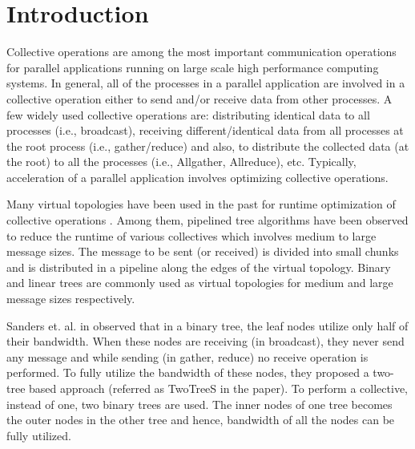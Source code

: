 \documentclass[sigplan,review,anonymous]{acmart}\settopmatter{printfolios=true,printccs=false,printacmref=false}
\begin{document}
\maketitle


\section{Introduction}
Collective operations are among the most important communication operations for parallel applications running on large scale high performance computing systems. In general, all of the processes in a parallel application are involved in a collective operation either to send and/or receive data from other processes. A few widely used collective operations are: distributing identical data to all processes (i.e., broadcast), receiving different/identical data from all processes at the root process (i.e., gather/reduce) and also, to distribute the collected data (at the root) to all the processes (i.e., Allgather, Allreduce), etc.  Typically, acceleration of a parallel application involves optimizing collective operations.

Many virtual topologies have been used in the past for runtime optimization of collective operations \cite{hoefler-moor-collectives}. Among them, pipelined tree algorithms have been observed to reduce the runtime of various collectives which involves medium to large message sizes. The message to be sent (or received) is divided into small chunks and is distributed in a pipeline along the edges of the virtual topology.  Binary and linear trees are commonly used as virtual topologies for medium and large message sizes respectively. 

Sanders et. al. in \cite{sanders_two-tree_2009} observed that in a binary tree, the leaf nodes utilize only half of their bandwidth. When these nodes are receiving (in broadcast), they never send any message and while sending (in gather, reduce) no receive operation is performed. To fully utilize the bandwidth of these nodes, they proposed a two-tree based approach (referred as TwoTreeS in the paper). To perform a collective, instead of one, two binary trees are used. The inner nodes of one tree becomes the outer nodes in the other tree and hence, bandwidth of all the nodes can be fully utilized. 
\end{document}
